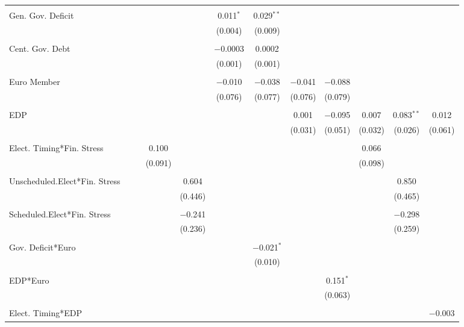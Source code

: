 \begin{table}[!htbp]
\begin{tabular}{@{\extracolsep{5pt}}lccccccccccc}
  & & & & & & & & & & & \\ 
 Gen. Gov. Deficit &  &  &  &  & 0.011$^{*}$ & 0.029$^{**}$ &  &  &  &  &  \\ 
  &  &  &  &  & (0.004) & (0.009) &  &  &  &  &  \\ 
  & & & & & & & & & & & \\ 
 Cent. Gov. Debt &  &  &  &  & $-$0.0003 & 0.0002 &  &  &  &  &  \\ 
  &  &  &  &  & (0.001) & (0.001) &  &  &  &  &  \\ 
  & & & & & & & & & & & \\ 
 Euro Member &  &  &  &  & $-$0.010 & $-$0.038 & $-$0.041 & $-$0.088 &  &  &  \\ 
  &  &  &  &  & (0.076) & (0.077) & (0.076) & (0.079) &  &  &  \\ 
  & & & & & & & & & & & \\ 
 EDP &  &  &  &  &  &  & 0.001 & $-$0.095 & 0.007 & 0.083$^{**}$ & 0.012 \\ 
  &  &  &  &  &  &  & (0.031) & (0.051) & (0.032) & (0.026) & (0.061) \\ 
  & & & & & & & & & & & \\ 
 Elect. Timing*Fin. Stress &  &  & 0.100 &  &  &  &  &  & 0.066 &  &  \\ 
  &  &  & (0.091) &  &  &  &  &  & (0.098) &  &  \\ 
  & & & & & & & & & & & \\ 
 Unscheduled.Elect*Fin. Stress &  &  &  & 0.604 &  &  &  &  &  & 0.850 &  \\ 
  &  &  &  & (0.446) &  &  &  &  &  & (0.465) &  \\ 
  & & & & & & & & & & & \\ 
 Scheduled.Elect*Fin. Stress &  &  &  & $-$0.241 &  &  &  &  &  & $-$0.298 &  \\ 
  &  &  &  & (0.236) &  &  &  &  &  & (0.259) &  \\ 
  & & & & & & & & & & & \\ 
 Gov. Deficit*Euro &  &  &  &  &  & $-$0.021$^{*}$ &  &  &  &  &  \\ 
  &  &  &  &  &  & (0.010) &  &  &  &  &  \\ 
  & & & & & & & & & & & \\ 
 EDP*Euro &  &  &  &  &  &  &  & 0.151$^{*}$ &  &  &  \\ 
  &  &  &  &  &  &  &  & (0.063) &  &  &  \\ 
  & & & & & & & & & & & \\ 
 Elect. Timing*EDP &  &  &  &  &  &  &  &  &  &  & $-$0.003 \\ 

\end{tabular}
\end{table}
